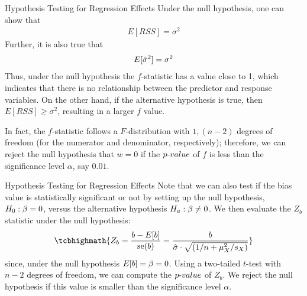 \begin{frame}{Hypothesis Testing for Regression Effects}
Under the null hypothesis, one can show that 
\begin{align*}
    E[RSS] = \sigma^2
\end{align*}
Further, it is also true that
\begin{align*}
    E[\hat{\sigma}^2] = \sigma^2
\end{align*}
Thus, under the null hypothesis the $f$-statistic has a value close to
1, which indicates that there is no relationship between the predictor
and response variables. On the other hand, if the alternative hypothesis
is true, then $E[RSS] \ge \sigma^2$, resulting in a larger $f$ value.

\medskip

In fact, the $f$-statistic follows a $F$-distribution with $1,(n-2)$ degrees of
freedom (for the numerator and denominator, respectively); therefore, we can reject the null hypothesis that $w = 0$ if
the ${p\text{-}value}$ of $f$ is less than the significance level $\alpha$, say $0.01$.
\end{frame}
%
%
%
%
\begin{frame}{Hypothesis Testing for Regression Effects}
Note that we can also test if the bias value is statistically
significant or not by setting up the null hypothesis, $H_0: \beta=0$, versus
the alternative hypothesis $H_a: \beta\ne 0$. We then evaluate the
$Z_{b}$ statistic %
under the null
hypothesis:
\begin{align*}
    \tcbhighmath{
    Z_{b} = \frac{b - E[b]}{\se(b)} =
\frac{b}{\hsigma\cdot \sqrt{(1/n + \mu_X^2/s_X)}} }
\end{align*}
since, under the null hypothesis $E[b] = \beta = 0$.
Using a two-tailed $t$-test with $n-2$ degrees of freedom, we can
compute the ${p\text{-}value}$ of $Z_{b}$. We reject the null hypothesis if
this value is smaller than the significance level $\alpha$.
\end{frame}
